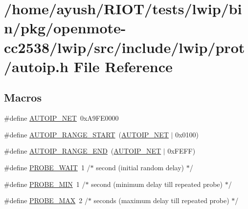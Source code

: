 \hypertarget{openmote-cc2538_2lwip_2src_2include_2lwip_2prot_2autoip_8h}{}\section{/home/ayush/\+R\+I\+O\+T/tests/lwip/bin/pkg/openmote-\/cc2538/lwip/src/include/lwip/prot/autoip.h File Reference}
\label{openmote-cc2538_2lwip_2src_2include_2lwip_2prot_2autoip_8h}
\subsection*{Macros}
\begin{DoxyCompactItemize}
\item 
\#define \hyperlink{openmote-cc2538_2lwip_2src_2include_2lwip_2prot_2autoip_8h_ac19d92e0bfcb52079adbe92fb569d468}{A\+U\+T\+O\+I\+P\+\_\+\+N\+ET}~0x\+A9\+F\+E0000
\item 
\#define \hyperlink{openmote-cc2538_2lwip_2src_2include_2lwip_2prot_2autoip_8h_a8b4506c8e0ab7631f49567f9b81779c6}{A\+U\+T\+O\+I\+P\+\_\+\+R\+A\+N\+G\+E\+\_\+\+S\+T\+A\+RT}~(\hyperlink{openmote-cc2538_2lwip_2src_2include_2lwip_2prot_2autoip_8h_ac19d92e0bfcb52079adbe92fb569d468}{A\+U\+T\+O\+I\+P\+\_\+\+N\+ET} $\vert$ 0x0100)
\item 
\#define \hyperlink{openmote-cc2538_2lwip_2src_2include_2lwip_2prot_2autoip_8h_a84dec606d57f40eed1cdc782f702f161}{A\+U\+T\+O\+I\+P\+\_\+\+R\+A\+N\+G\+E\+\_\+\+E\+ND}~(\hyperlink{openmote-cc2538_2lwip_2src_2include_2lwip_2prot_2autoip_8h_ac19d92e0bfcb52079adbe92fb569d468}{A\+U\+T\+O\+I\+P\+\_\+\+N\+ET} $\vert$ 0x\+F\+E\+F\+F)
\item 
\#define \hyperlink{openmote-cc2538_2lwip_2src_2include_2lwip_2prot_2autoip_8h_aecea6220ab7fcd0910262d5929eb5d95}{P\+R\+O\+B\+E\+\_\+\+W\+A\+IT}~1   /$\ast$ second   (initial random delay)                 $\ast$/
\item 
\#define \hyperlink{openmote-cc2538_2lwip_2src_2include_2lwip_2prot_2autoip_8h_a959b454f842224af595205645244f946}{P\+R\+O\+B\+E\+\_\+\+M\+IN}~1   /$\ast$ second   (minimum delay till repeated probe)    $\ast$/
\item 
\#define \hyperlink{openmote-cc2538_2lwip_2src_2include_2lwip_2prot_2autoip_8h_ad408cf94a71b848cff8108dc5c1558e6}{P\+R\+O\+B\+E\+\_\+\+M\+AX}~2   /$\ast$ seconds  (maximum delay till repeated probe)    $\ast$/

\end{DoxyCompactItemize}

